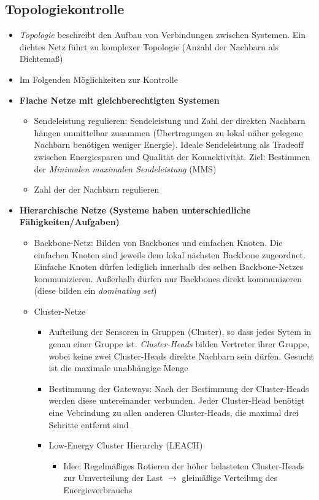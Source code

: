 \subsection{Topologiekontrolle}
\begin{itemize}
	\item \textit{Topologie} beschreibt den Aufbau von Verbindungen zwischen Systemen. Ein dichtes Netz führt zu komplexer Topologie (Anzahl der Nachbarn als Dichtemaß)
	\item Im Folgenden Möglichkeiten zur Kontrolle
	\item \textbf{Flache Netze mit gleichberechtigten Systemen}
	\begin{itemize}
		\item Sendeleistung regulieren: Sendeleistung und Zahl der direkten Nachbarn hängen unmittelbar zusammen (Übertragungen zu lokal näher gelegene Nachbarn benötigen weniger Energie). Ideale Sendeleistung als Tradeoff zwischen Energiesparen und Qualität der Konnektivität. Ziel: Bestimmen der \textit{Minimalen maximalen Sendeleistung} (MMS)
		\item Zahl der der Nachbarn regulieren
	\end{itemize}
	\item \textbf{Hierarchische Netze (Systeme haben unterschiedliche Fähigkeiten/Aufgaben)}
	\begin{itemize}
		\item Backbone-Netz: Bilden von Backbones und einfachen Knoten. Die einfachen Knoten sind jeweils dem lokal nächsten Backbone zugeordnet. Einfache Knoten dürfen lediglich innerhalb des selben Backbone-Netzes kommunizieren. Außerhalb dürfen nur Backbones direkt kommunizeren (diese bilden ein \textit{dominating set})
		\item Cluster-Netze
		\begin{itemize}
			\item Aufteilung der Sensoren in Gruppen (Cluster), so dass jedes Sytem in genau einer Gruppe ist. \textit{Cluster-Heads} bilden Vertreter ihrer Gruppe, wobei keine zwei Cluster-Heads direkte Nachbarn sein dürfen. Gesucht ist die maximale unabhängige Menge
			\item Bestimmung der Gateways: Nach der Bestimmung der Cluster-Heads werden diese untereinander verbunden. Jeder Cluster-Head benötigt eine Vebrindung zu allen anderen Cluster-Heads, die maximal drei Schritte entfernt sind
			\item Low-Energy Cluster Hierarchy (LEACH)
			\begin{itemize}
				\item Idee: Regelmäßiges Rotieren der höher belasteten Cluster-Heads zur Umverteilung der Last \(\rightarrow\) gleimäßige Verteilung des Energieverbrauchs

\end{itemize}
\end{itemize}
\end{itemize}
\end{itemize}

